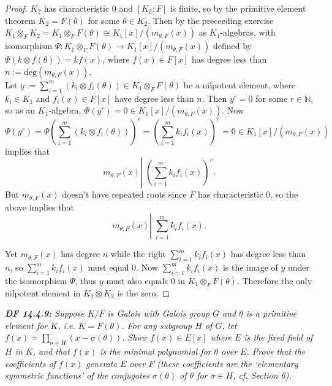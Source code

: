 \documentclass{article}
\begin{document}
  \begin{proof}
    $K_2$ has characteristic 0 and $[K_2:F]$ is finite, so by the primitive
    element theorem $K_2=F(\theta)$ for some $\theta\in K_2$. Then by the
    preceeding exercise $K_1\otimes_F K_2 =K_1\otimes_F F(\theta) \cong
    K_1[x]/(m_{\theta,F}(x))$ as $K_1$-algebras, with isomorphism
    $\Psi:K_1\otimes_F F(\theta) \rightarrow K_1[x]/(m_{\theta,F}(x))$
    defined by $\Psi(k\otimes f(\theta)) =kf(x)$, where $f(x)\in F[x]$ has
    degree less than $n:=\text{deg}(m_{\theta,F}(x))$. \\

    Let $y:=\sum_{i=1}^m (k_i\otimes f_i(\theta)) \in K_1\otimes_F
    F(\theta)$ be a nilpotent element, where $k_i\in K_1$ and $f_i(x)\in
    F[x]$ have degree less than $n$. Then $y^r=0$ for some
    $r\in\mathbb{N}$, so as an $K_1$-algebra, $\Phi(y^r)=0\in
    K_1[x]/(m_{\theta,F}(x))$. Now
    \[\Psi(y^r) =\Psi\left(\sum_{i=1}^m (k_i\otimes f_i(\theta)) \right)^r
    =\left(\sum_{i=1}^m k_if_i(x) \right)^r =0\in
    K_1[x]/(m_{\theta,F}(x))\]
    implies that 
    \[m_{\theta,F}(x) \left|\; \left(\sum_{i=1}^m k_if_i(x) \right)^r
    \right..\]
    But $m_{\theta,F}(x)$ doesn't have repeated roots since $F$ has
    characteristic 0, so the above implies that
    \[m_{\theta,F}(x) \left|\; \sum_{i=1}^m k_if_i(x) \right..\]

    Yet $m_{\theta,F}(x)$ has degree $n$ while the right $\sum_{i=1}^m
    k_if_i(x)$ has degree less than $n$, so $\sum_{i=1}^m k_if_i(x)$ must
    equal 0. Now $\sum_{i=1}^m k_if_i(x)$ is the image of $y$ under the
    isomorphism $\Psi$, thus $y$ must also equals 0 in $K_1\otimes_F
    F(\theta)$. Therefore the only nilpotent element in $K_1\otimes K_2$
    is the zero.
  \end{proof}

\it \textbf{DF 14.4.9:} Suppose $K/F$ is Galois with Galois group $G$ and
  $\theta$ is a primitive element for $K$, i.e. $K=F(\theta)$. For any
  subgroup $H$ of $G$, let $f(x) =\prod_{\sigma\in H} (x-\sigma(\theta))$.
  Show $f(x)\in E[x]$ where $E$ is the fixed field of $H$ in $K$, and that
  $f(x)$ is the minimal polynomial for $\theta$ over $E$. Prove that the
  coefficients of $f(x)$ generate $E$ over $F$ (these coefficients are the
  `elementary symmetric functions' of the conjugates $\sigma(\theta)$ of
  $\theta$ for $\sigma\in H$, cf. Section 6).
\end{document}
